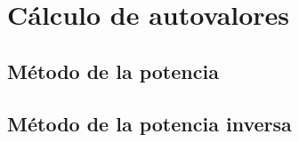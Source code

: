 \section{Cálculo de autovalores}
\subsection{Método de la potencia}
\subsection{Método de la potencia inversa}
